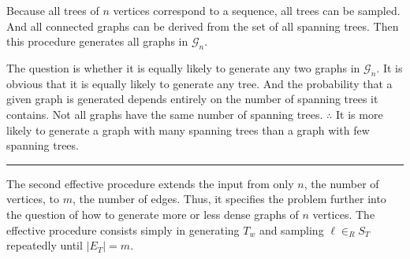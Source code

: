 \documentclass[
]{article}
\begin{document}
Because all trees of \(n\) vertices correspond to a sequence, all trees
can be sampled. And all connected graphs can be derived from the set of
all spanning trees. Then this procedure generates all graphs in
\(\mathcal{G}_n\).

The question is whether it is equally likely to generate any two graphs
in \(\mathcal{G}_n\). It is obvious that it is equally likely to
generate any tree. And the probability that a given graph is generated
depends entirely on the number of spanning trees it contains. Not all
graphs have the same number of spanning trees. \(\therefore\) It is more
likely to generate a graph with many spanning trees than a graph with
few spanning trees.

\begin{center}\rule{0.5\linewidth}{0.5pt}\end{center}

The second effective procedure extends the input from only \(n\), the
number of vertices, to \(m\), the number of edges. Thus, it specifies
the problem further into the question of how to generate more or less
dense graphs of \(n\) vertices. The effective procedure consists simply
in generating \(T_w\) and sampling \(\ell \in_R S_T\) repeatedly until
\(|E_T| = m\).
\end{document}

